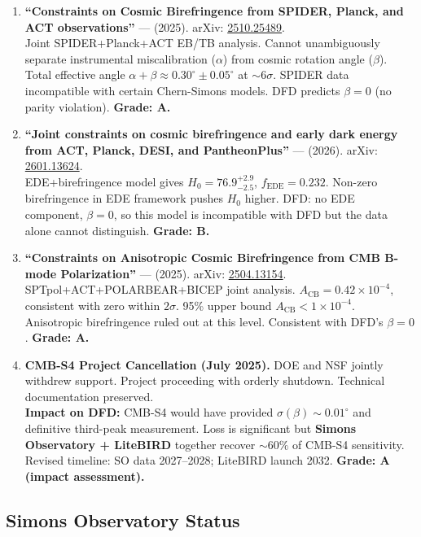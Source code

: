 \documentclass[11pt,a4paper]{article}
\begin{document}
\begin{enumerate}
\item \textbf{``Constraints on Cosmic Birefringence from SPIDER, Planck, and ACT observations''} --- (2025). arXiv: \href{https://arxiv.org/abs/2510.25489}{2510.25489}.\\
Joint SPIDER+Planck+ACT EB/TB analysis. Cannot unambiguously separate instrumental miscalibration ($\alpha$) from cosmic rotation angle ($\beta$). Total effective angle $\alpha + \beta \approx 0.30^\circ \pm 0.05^\circ$ at $\sim 6\sigma$. SPIDER data incompatible with certain Chern-Simons models. DFD predicts $\beta = 0$ (no parity violation). \textbf{Grade: A.}

\item \textbf{``Joint constraints on cosmic birefringence and early dark energy from ACT, Planck, DESI, and PantheonPlus''} --- (2026). arXiv: \href{https://arxiv.org/abs/2601.13624}{2601.13624}.\\
EDE+birefringence model gives $H_0 = 76.9^{+2.9}_{-2.5}$, $f_\mathrm{EDE} = 0.232$. Non-zero birefringence in EDE framework pushes $H_0$ higher. DFD: no EDE component, $\beta = 0$, so this model is incompatible with DFD but the data alone cannot distinguish. \textbf{Grade: B.}

\item \textbf{``Constraints on Anisotropic Cosmic Birefringence from CMB B-mode Polarization''} --- (2025). arXiv: \href{https://arxiv.org/abs/2504.13154}{2504.13154}.\\
SPTpol+ACT+POLARBEAR+BICEP joint analysis. $A_\mathrm{CB} = 0.42 \times 10^{-4}$, consistent with zero within $2\sigma$. 95\% upper bound $A_\mathrm{CB} < 1 \times 10^{-4}$. Anisotropic birefringence ruled out at this level. Consistent with DFD's $\beta = 0$. \textbf{Grade: A.}

\item \textbf{CMB-S4 Project Cancellation (July 2025).} DOE and NSF jointly withdrew support. Project proceeding with orderly shutdown. Technical documentation preserved.\\
\textbf{Impact on DFD:} CMB-S4 would have provided $\sigma(\beta) \sim 0.01^\circ$ and definitive third-peak measurement. Loss is significant but \textbf{Simons Observatory + LiteBIRD} together recover $\sim 60\%$ of CMB-S4 sensitivity. Revised timeline: SO data 2027--2028; LiteBIRD launch 2032. \textbf{Grade: A (impact assessment).}
\end{enumerate}

\subsection{Simons Observatory Status}
\end{document}
